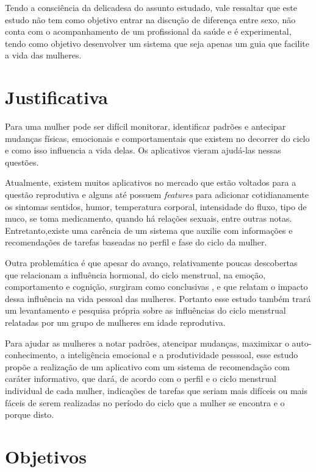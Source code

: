 Tendo a consciência da delicadesa do assunto estudado, vale ressaltar que este estudo não tem como objetivo entrar na discução de diferença entre sexo, não conta com o acompanhamento de um profissional da saúde e é experimental, tendo como objetivo desenvolver um sistema que seja apenas um guia que facilite a vida das mulheres. 

\section{Justificativa}

Para uma mulher pode ser difícil monitorar, identificar padrões e antecipar mudanças físicas, emocionais e comportamentais que existem no decorrer do ciclo e como isso influencia a vida delas. Os aplicativos vieram ajudá-las nessas questões.

Atualmente, existem muitos aplicativos no mercado que estão voltados para a questão reprodutiva e alguns até possuem \textit{features} para adicionar cotidianamente os sintomas sentidos, humor, temperatura corporal, intensidade do fluxo, tipo de muco, se toma medicamento, quando há relações sexuais, entre outras notas. Entretanto,existe uma carência de um sistema que auxilie com informações e recomendações de tarefas baseadas no perfil e fase do ciclo da mulher.

Outra problemática é que apesar do avanço, relativamente poucas descobertas que relacionam a influência hormonal, do ciclo menstrual, na emoção, comportamento e cognição, surgiram como conclusivas \cite{poroma2014}, e que relatam o impacto dessa influência na vida pessoal das mulheres. Portanto esse estudo também trará um levantamento e pesquisa própria sobre as influências do ciclo menstrual relatadas por um grupo de mulheres em idade reprodutiva.

Para ajudar as mulheres a notar padrões, atencipar mudanças, maximixar o auto-conhecimento, a inteligência emocional e a produtividade pesssoal, esse estudo propõe a realização de um aplicativo com um sistema de recomendação com caráter informativo, que dará, de acordo com o perfil e o ciclo menstrual individual de cada mulher, indicações de tarefas que seriam mais difíceis ou mais fáceis de serem realizadas no período do ciclo que a mulher se encontra e o porque disto.

\section{Objetivos}

